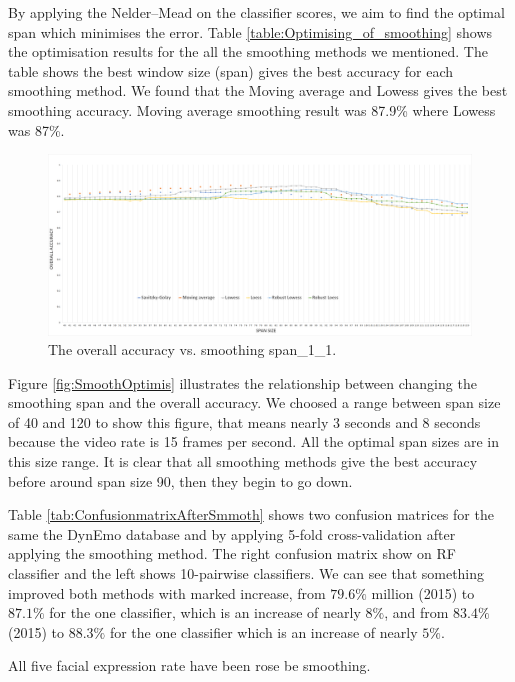 By applying the Nelder–Mead on the classifier scores, we aim to find the optimal span which minimises the error. Table \ref{table:Optimising_of_smoothing} shows the optimisation results for the all the smoothing methods we mentioned. The table shows the best window size (span) gives the best accuracy for each smoothing method. We found that the Moving average and Lowess gives the best smoothing accuracy.  Moving average smoothing result was  87.9\% where Lowess was 87\%. 
\begin{figure}[t]
	\centering
	\includegraphics[width=1\textwidth, center]{Chapter5/Figs/SmoothOptimis.png}
	\caption{\label{fig:SmoothOptimis}The overall accuracy vs. smoothing span\_1\_1.}
	\label{fig:DVD14_1lowess_smothing}
\end{figure}
Figure \ref{fig:SmoothOptimis} illustrates the relationship between changing the smoothing span and the overall accuracy. We choosed a range between span size of 40 and 120 to show this figure, that means nearly 3 seconds and 8 seconds because the video rate is 15 frames per second.  All the optimal span sizes are in this size range. It is clear that all smoothing methods give the best accuracy before around span size 90, then they begin to go down.

Table \ref{tab:ConfusionmatrixAfterSmmoth} shows two confusion matrices for the same the DynEmo database and by applying 5-fold cross-validation after applying the smoothing method. The right confusion matrix show on RF classifier and the left shows 10-pairwise classifiers. 
We can see that something improved both methods with marked increase, from $79.6\%$ million (2015) to $87.1\%$  for the one classifier, which is an increase of nearly $8\%$, and from $83.4\%$  (2015) to $88.3\%$ for the one classifier which is an increase of nearly $5\%$.

All five facial expression rate have been rose be smoothing.  


